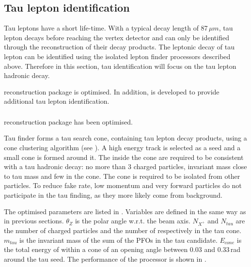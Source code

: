 \subsection{Tau lepton identification}

Tau leptons have a short life-time. With a typical decay length of 87\,$\mu{m}$, tau lepton decays before reaching the vertex detector and can only be identified through the reconstruction of their decay products. The leptonic decay of tau lepton can be identified using the isolated lepton finder processors described above. Therefore in this section, tau identification will focus on the tau lepton hadronic decay.

\TauFinderProcessor reconstruction package is optimised. In addition, \BonoTauFinder is developed to provide additional tau lepton identification.




\subsubsection{\TauFinderProcessor}


\TauFinderProcessor \cite{LCD-Note-2010-009} reconstruction package has been optimised.

Tau finder forms a tau search cone, containing tau lepton decay products, using a cone clustering algorithm (see  ). A high energy track is selected as a seed and a small cone is formed around it. The \PFOs inside the cone are required to be consistent with a tau hadronic decay: no more than 3 charged particles, invariant mass close to tau mass and few \PFOs in the cone. The cone is required to be isolated from other particles. To reduce fake rate, low momentum and very forward particles do not participate in the tau finding, as they more likely come from \ggHad background.


The optimised parameters are listed in . Variables are defined in the same way as in previous sections. $\theta_Z$ is the polar angle w.r.t. the beam axis. $N_{X^+}$ and $N_{tau}$ are the number of charged particles and the number of \PFOs respectively in the tau cone. $m_{tau}$ is the invariant mass of the sum of the PFOs in the tau candidate. $E_{cone}$ is the total energy of \PFOs within a cone of an opening angle between 0.03 and 0.33\,rad  around the tau seed. The performance of the processor is shown in .


